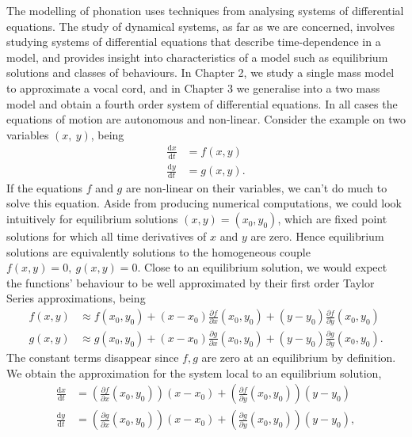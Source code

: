 \documentclass{book}
\begin{document}
The modelling of phonation uses techniques from analysing systems of differential equations.
The study of dynamical systems, as far as we are concerned,
involves studying systems of differential equations that describe time-dependence in a model,
and provides insight into characteristics of a model such as equilibrium solutions and classes of behaviours.
In Chapter 2, we study a single mass model to approximate a vocal cord,
and in Chapter 3 we generalise into a two mass model and obtain a fourth order system of differential equations.
In all cases the equations of motion are autonomous and non-linear.
Consider the example on two variables \((x,~y)\), being
\begin{equation}
    \begin{aligned}
        \frac{\mathrm{d}x}{\mathrm{d}t} &= f(x,y) \\
        \frac{\mathrm{d}y}{\mathrm{d}t} &= g(x,y).
    \end{aligned}
\end{equation}
If the equations \(f\) and \(g\) are non-linear on their variables,
we can't do much to solve this equation.
Aside from producing numerical computations, we could look intuitively for equilibrium solutions \((x,y) = (x_0,y_0)\),
which are fixed point solutions for which all time derivatives of \(x\) and \(y\) are zero.
Hence equilibrium solutions are equivalently solutions to the homogeneous couple \(f(x,y) = 0,~g(x,y) = 0\).
Close to an equilibrium solution,
we would expect the functions' behaviour to be well approximated by their first order Taylor Series approximations, being
\begin{equation}
    \begin{aligned}
        f(x,y) &\approx f(x_0,y_0) + (x-x_0)\frac{\partial f}{\partial x}(x_0,y_0) + (y-y_0)\frac{\partial f}{\partial y}(x_0,y_0) \\
        g(x,y) &\approx g(x_0,y_0) + (x-x_0)\frac{\partial g}{\partial x}(x_0,y_0) + (y-y_0)\frac{\partial g}{\partial y}(x_0,y_0).
    \end{aligned}
\end{equation}
The constant terms disappear since \(f, g\) are zero at an equilibrium by definition. We obtain the approximation for the system local to an equilibrium solution,
\begin{equation}
    \begin{aligned}
        \frac{\mathrm{d}x}{\mathrm{d}t} &= \left(\frac{\partial f}{\partial x}(x_0,y_0)\right)(x-x_0) + \left(\frac{\partial f}{\partial y}(x_0,y_0)\right)(y-y_0) \\
        \frac{\mathrm{d}y}{\mathrm{d}t} &= \left(\frac{\partial g}{\partial x}(x_0,y_0)\right)(x-x_0) + \left(\frac{\partial g}{\partial y}(x_0,y_0)\right)(y-y_0),
    \end{aligned}
\end{equation}
\end{document}
